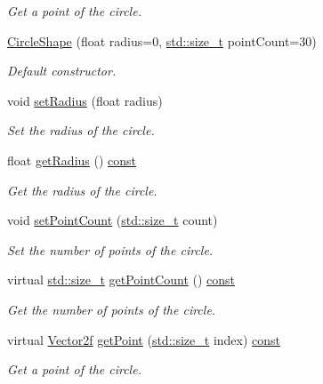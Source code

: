 \begin{DoxyCompactItemize}
\begin{DoxyCompactList}\small\item\em Get a point of the circle. \end{DoxyCompactList}\item 
\hyperlink{classsf_1_1_circle_shape_aaebe705e7180cd55588eb19488af3af1}{Circle\-Shape} (float radius=0, \hyperlink{nc__alloc_8h_a7b60c5629e55e8ec87a4547dd4abced4}{std\-::size\-\_\-t} point\-Count=30)
\begin{DoxyCompactList}\small\item\em Default constructor. \end{DoxyCompactList}\item 
void \hyperlink{classsf_1_1_circle_shape_a21cdf85fc2f201e10222a241af864be0}{set\-Radius} (float radius)
\begin{DoxyCompactList}\small\item\em Set the radius of the circle. \end{DoxyCompactList}\item 
float \hyperlink{classsf_1_1_circle_shape_afaf5175a75b6179cc177b1281027ab00}{get\-Radius} () \hyperlink{term__entry_8h_a57bd63ce7f9a353488880e3de6692d5a}{const} 
\begin{DoxyCompactList}\small\item\em Get the radius of the circle. \end{DoxyCompactList}\item 
void \hyperlink{classsf_1_1_circle_shape_a16590ee7bdf5c9f752275468a4997bed}{set\-Point\-Count} (\hyperlink{nc__alloc_8h_a7b60c5629e55e8ec87a4547dd4abced4}{std\-::size\-\_\-t} count)
\begin{DoxyCompactList}\small\item\em Set the number of points of the circle. \end{DoxyCompactList}\item 
virtual \hyperlink{nc__alloc_8h_a7b60c5629e55e8ec87a4547dd4abced4}{std\-::size\-\_\-t} \hyperlink{classsf_1_1_circle_shape_aba76ceafb7a714f02c85bc5ea491eaf3}{get\-Point\-Count} () \hyperlink{term__entry_8h_a57bd63ce7f9a353488880e3de6692d5a}{const} 
\begin{DoxyCompactList}\small\item\em Get the number of points of the circle. \end{DoxyCompactList}\item 
virtual \hyperlink{namespacesf_a80cea3c46537294fd1d8d428566ad8b2}{Vector2f} \hyperlink{classsf_1_1_circle_shape_ac7452005d91cefd5c6805281a8fbc1b3}{get\-Point} (\hyperlink{nc__alloc_8h_a7b60c5629e55e8ec87a4547dd4abced4}{std\-::size\-\_\-t} index) \hyperlink{term__entry_8h_a57bd63ce7f9a353488880e3de6692d5a}{const} 
\begin{DoxyCompactList}\small\item\em Get a point of the circle. \end{DoxyCompactList}\end{DoxyCompactItemize}
